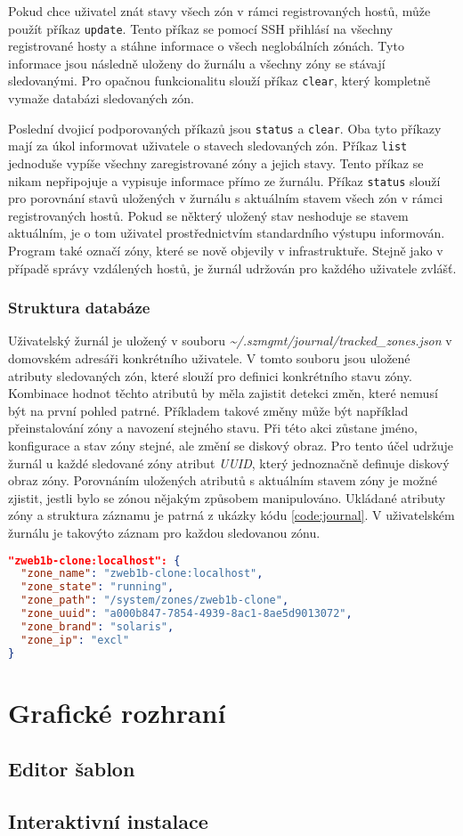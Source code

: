 Pokud chce uživatel znát stavy všech zón v rámci registrovaných hostů, může použít příkaz \verb|update|. Tento příkaz se pomocí
SSH přihlásí na všechny registrované hosty a stáhne informace o všech neglobálních zónách.  Tyto informace jsou následně uloženy
do žurnálu a všechny zóny se stávají sledovanými. Pro opačnou funkcionalitu slouží příkaz \verb|clear|, který kompletně vymaže
databázi sledovaných zón.

Poslední dvojicí podporovaných příkazů jsou \verb|status| a \verb|clear|. Oba tyto příkazy mají za úkol informovat uživatele
o stavech sledovaných zón. Příkaz \verb|list| jednoduše vypíše všechny zaregistrované zóny a jejich stavy. Tento příkaz se nikam
nepřipojuje a vypisuje informace přímo ze žurnálu. Příkaz \verb|status| slouží pro porovnání stavů uložených v žurnálu s 
aktuálním stavem všech zón v rámci registrovaných hostů. Pokud se některý uložený stav neshoduje se stavem aktuálním, je 
o tom uživatel prostřednictvím standardního výstupu informován. Program také označí zóny, které se nově objevily v infrastruktuře. 
Stejně jako v případě správy vzdálených hostů, je žurnál udržován pro každého uživatele zvlášť. 
\subsubsection{Struktura databáze}
\label{chapter:implementation:client:journal:database}
Uživatelský žurnál je uložený v souboru \textit{\textasciitilde/.szmgmt/journal/tracked\_zones.json} v domovském adresáři
konkrétního uživatele. V tomto souboru jsou uložené atributy sledovaných zón, které slouží pro definici konkrétního stavu zóny.
Kombinace hodnot těchto atributů by měla zajistit detekci změn, které nemusí být na první pohled patrné. Příkladem takové změny
může být například přeinstalování zóny a navození stejného stavu. Při této akci zůstane jméno, konfigurace a stav zóny stejné,
ale změní se diskový obraz. Pro tento účel udržuje žurnál u každé sledované zóny atribut \textit{UUID}, který jednoznačně
definuje diskový obraz zóny. Porovnáním uložených atributů s aktuálním stavem zóny je možné zjistit, jestli bylo se zónou 
nějakým způsobem manipulováno. Ukládané atributy zóny a struktura záznamu je patrná z ukázky kódu \ref{code:journal}. V 
uživatelském žurnálu je takovýto záznam pro každou sledovanou zónu.
\begin{lstlisting}[language=json, caption={Záznam stavu zóny v žurnálu}, float,label={code:journal}]  
"zweb1b-clone:localhost": {
  "zone_name": "zweb1b-clone:localhost",
  "zone_state": "running",
  "zone_path": "/system/zones/zweb1b-clone",
  "zone_uuid": "a000b847-7854-4939-8ac1-8ae5d9013072",
  "zone_brand": "solaris",
  "zone_ip": "excl"
}
\end{lstlisting}
\section{Grafické rozhraní}
\label{chapter:implementation:gui}
\subsection{Editor šablon}
\label{chapter:implementation:gui:editor}
\subsection{Interaktivní instalace}
\label{chapter:implementation:gui:interactive}